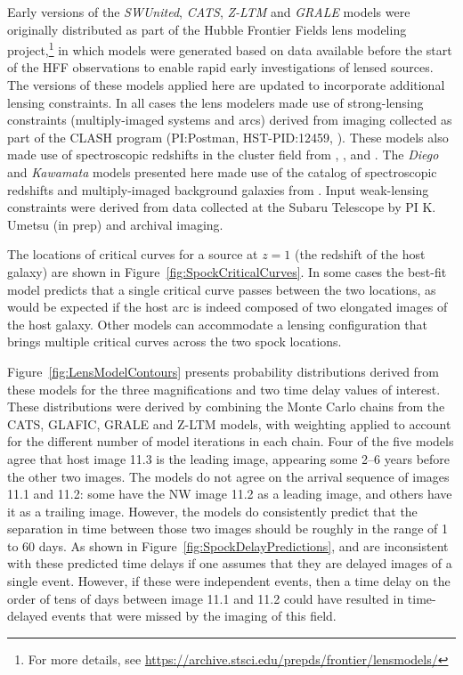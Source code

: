 Early versions of the {\it SWUnited}, {\it CATS}, {\it Z-LTM} and {\it
  GRALE} models were originally distributed as part of the Hubble
Frontier Fields lens modeling project,\footnote{For more details, see
  \url{https://archive.stsci.edu/prepds/frontier/lensmodels/}} in
which models were generated based on data available before the start
of the HFF observations to enable rapid early investigations of lensed
sources. The versions of these models applied here are updated to
incorporate additional lensing constraints.  In all cases the lens
modelers made use of strong-lensing constraints (multiply-imaged
systems and arcs) derived from \HST imaging collected as part of the
CLASH program (PI:Postman, HST-PID:12459,
\citealt{Postman:2012}). These models also made use of spectroscopic
redshifts in the cluster field from \citet{Mann:2012},
\citet{Christensen:2012}, and \citet{Grillo:2015a}.  The {\it Diego}
and {\it Kawamata} models presented here made use of the catalog of
spectroscopic redshifts and multiply-imaged background galaxies from
\citet{Caminha:2016}.  Input weak-lensing constraints were derived
from data collected at the Subaru Telescope by PI K. Umetsu (in prep)
and archival imaging.

The locations of critical curves for a source at $z=1$ (the redshift
of the \spock host galaxy) are shown in
Figure~\ref{fig:SpockCriticalCurves}. In some cases the best-fit model
predicts that a single critical curve passes between the two \spock
locations, as would be expected if the host arc is indeed composed of
two elongated images of the host galaxy. Other models can accommodate
a lensing configuration that brings multiple critical curves across
the two spock locations.

Figure~\ref{fig:LensModelContours} presents probability distributions
derived from these models for the three magnifications and two time
delay values of interest.  These distributions were derived by
combining the Monte Carlo chains from the CATS, GLAFIC, GRALE and
Z-LTM models, with weighting applied to account for the different
number of model iterations in each chain. Four of the five models
agree that host image 11.3 is the leading image, appearing some 2--6
years before the other two images.  The models do not agree on the
arrival sequence of images 11.1 and 11.2: some have the NW image 11.2
as a leading image, and others have it as a trailing image.  However,
the models do consistently predict that the separation in time between
those two images should be roughly in the range of 1 to 60 days. As
shown in Figure~\ref{fig:SpockDelayPredictions}, \spockone and
\spocktwo are inconsistent with these predicted time delays if one
assumes that they are delayed images of a single event.  However, if
these were independent events, then a time delay on the order of tens of
days between image 11.1 and 11.2 could have resulted in time-delayed 
events that were missed by the \HST imaging of this field.


